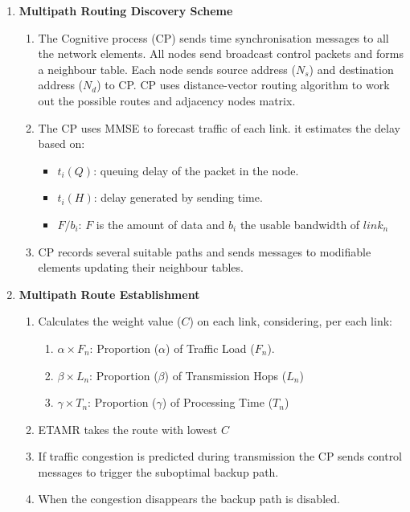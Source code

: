 \begin{enumerate}

\item \textbf{Multipath Routing Discovery Scheme}
	\begin{enumerate}
	\item The Cognitive process (CP) sends time synchronisation messages to all the network elements. All nodes send broadcast control packets and forms a neighbour table. Each node sends source address ($N_{s}$) and destination address ($N_{d}$) to CP. CP uses distance-vector routing algorithm to work out the possible routes and adjacency nodes matrix.
	\item The CP uses MMSE to forecast traffic of each link. it estimates the delay based on:
		\begin{itemize}
		\item $t_{i}(Q)$: queuing delay of the packet in the node.
		\item $t_{i}(H)$: delay generated by sending time.
		\item $F/b_{i}$: $F$ is the amount of data and $b_{i}$ the usable bandwidth of $link_{n}$
		\end{itemize}
	\item CP records several suitable paths and sends messages to modifiable elements updating their neighbour tables.\\	
	\end{enumerate}

\item \textbf{Multipath Route Establishment}
	\begin{enumerate}
	\item Calculates the weight value ($C$) on each link, considering, per each link: 
		\begin{enumerate}
		\item $\alpha\times F_{n}$: Proportion ($\alpha$) of Traffic Load ($F_{n}$).
		\item $\beta\times L_{n}$: Proportion ($\beta$) of Transmission Hops ($L_{n}$)
		\item $\gamma\times T_{n}$: Proportion ($\gamma$) of Processing Time ($T_{n}$)
		\end{enumerate}
 	\item ETAMR takes the route with lowest $C$
	\item If traffic congestion is predicted during transmission the CP sends control messages to trigger the suboptimal backup path.
	\item When the congestion disappears the backup path is disabled.\\ 
	\end{enumerate}



\end{enumerate}
